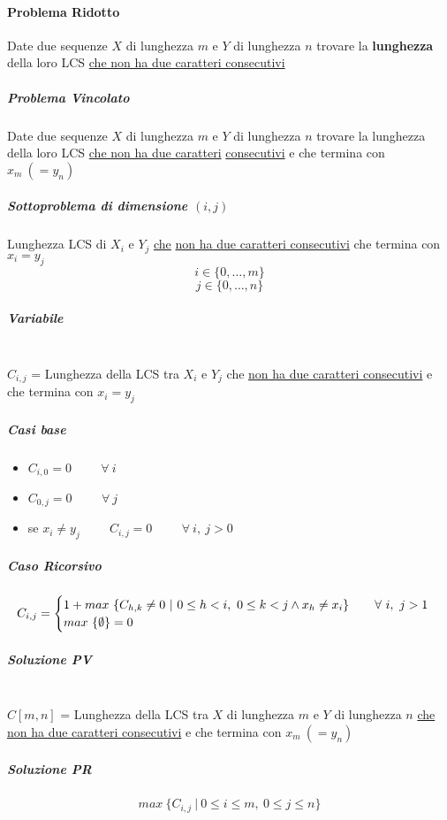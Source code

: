 \documentclass[12pt]{article}
\begin{document}
\paragraph{Problema Ridotto}
Date due sequenze $X$ di lunghezza $m$ e $Y$ di lunghezza $n$ trovare la \textbf{lunghezza} della loro LCS \underline{che non ha due caratteri consecutivi}
\subparagraph{Problema Vincolato}
Date due sequenze $X$ di lunghezza $m$ e $Y$ di lunghezza $n$ trovare la lunghezza della loro LCS \underline{che non ha due caratteri} \underline{consecutivi} e che termina con $x_m \ (=y_n)$
\subparagraph{Sottoproblema di dimensione $(i, j)$}
Lunghezza LCS di $X_i$ e $Y_j$ \underline{che} \underline{non ha due caratteri consecutivi} che termina con $x_i = y_j$
$$i \in \{0, \dots, m\}$$
$$j \in \{0, \dots, n\}$$
\subparagraph{Variabile}\mbox{}\\
$C_{i,j}$ = Lunghezza della LCS tra $X_i$ e $Y_j$ che \underline{non ha due caratteri consecutivi} e che termina con $x_i = y_j$
\subparagraph{Casi base}
\begin{itemize}
    \item $C_{i,0}=0 \hspace{1cm} \forall \ i$
    \item $C_{0,j}=0 \hspace{1cm} \forall \ j$
    \item se $x_i \neq y_j \hspace{1cm} C_{i,j}=0 \hspace{1cm} \forall \ i, \ j > 0$
\end{itemize}
\subparagraph{Caso Ricorsivo}
\[
    C_{i, j}=\begin{cases}
        1 + max \ \{C_{h, k}\neq 0 \ | \ 0 \leq h<i, \ 0 \leq k<j \land x_h \neq x_i\}$ \hspace{0.5cm} $\forall \ i, \ j>1 \\
        max \ \{\emptyset\} = 0
    \end{cases}
\]
\subparagraph{Soluzione PV}\mbox{}\\
$C[m,n]$ = Lunghezza della LCS tra $X$ di lunghezza $m$ e $Y$ di lunghezza $n$ \underline{che non ha due caratteri consecutivi} e che termina con $x_m \ (=y_n)$
\subparagraph{Soluzione PR}
$$max \ \{C_{i,j} \ | \ 0\leq i \leq m, \ 0\leq j \leq n\}$$
\end{document}
